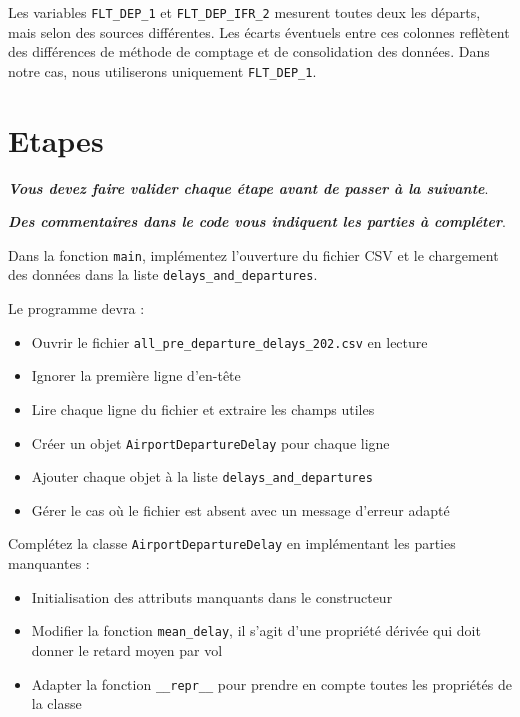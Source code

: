 \documentclass[12pt, a4paper]{exam}
\begin{document}
Les variables \texttt{FLT\_DEP\_1} et \texttt{FLT\_DEP\_IFR\_2} mesurent toutes
deux les départs, mais selon des sources différentes. Les écarts éventuels
entre ces colonnes reflètent des différences de méthode de comptage et de
consolidation des données. Dans notre cas, nous utiliserons uniquement
\texttt{FLT\_DEP\_1}.

\newpage
\section{Etapes}

\textit{\textbf{Vous devez faire valider chaque étape avant de passer à la suivante}}.

\textit{\textbf{Des commentaires dans le code vous indiquent les parties à compléter}}.

\begin{questions}


  Dans la fonction \texttt{main}, implémentez l'ouverture du fichier CSV et le
  chargement des données dans la liste \texttt{delays\_and\_departures}.

  Le programme devra :
  \begin{itemize}
    \item Ouvrir le fichier \texttt{all\_pre\_departure\_delays\_202.csv} en lecture
    \item Ignorer la première ligne d'en-tête
    \item Lire chaque ligne du fichier et extraire les champs utiles
    \item Créer un objet \texttt{AirportDepartureDelay} pour chaque ligne
    \item Ajouter chaque objet à la liste \texttt{delays\_and\_departures}
    \item Gérer le cas où le fichier est absent avec un message d'erreur adapté
  \end{itemize}

  \vspace{0.6\baselineskip}

  Complétez la classe \texttt{AirportDepartureDelay} en implémentant les parties
  manquantes :
  \begin{itemize}
    \item Initialisation des attributs manquants dans le constructeur
    \item Modifier la fonction \texttt{mean\_delay}, il s'agit d'une propriété dérivée qui doit donner le retard moyen par vol
    \item Adapter la fonction \texttt{\_\_repr\_\_} pour prendre en compte toutes les propriétés de la classe
  \end{itemize}


\end{questions}
\end{document}
